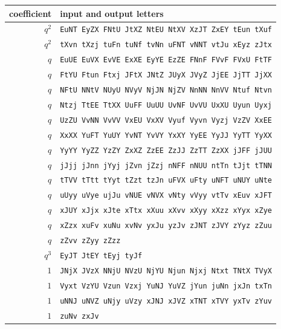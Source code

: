 \begin{tabular}{r@{\quad}l}
 coefficient & input and output letters \\ \hline
 $q^2$ & \texttt{EuNT EyZX FNtU JtXZ NtEU NtXV XzJT ZxEY tEun tXuf} \\
 $q^2$ & \texttt{tXvn tXzj tuFn tuNf tvNn uFNT vNNT vtJu xEyz zJtx} \\
 $q$ & \texttt{EuUE EuVX EvVE ExXE EyYE EzZE FNnF FVvF FVxU FtTF} \\
 $q$ & \texttt{FtYU Ftun Ftxj JFtX JNtZ JUyX JVyZ JjEE JjTT JjXX} \\
 $q$ & \texttt{NFtU NNtV NUyU NVyV NjJN NjZV NnNN NnVV Ntuf Ntvn} \\
 $q$ & \texttt{Ntzj TtEE TtXX UuFF UuUU UvNF UvVU UxXU Uyun Uyxj} \\
 $q$ & \texttt{UzZU VvNN VvVV VxEU VxXV Vyuf Vyvn Vyzj VzZV XxEE} \\
 $q$ & \texttt{XxXX YuFT YuUY YvNT YvVY YxXY YyEE YyJJ YyTT YyXX} \\
 $q$ & \texttt{YyYY YyZZ YzZY ZxXZ ZzEE ZzJJ ZzTT ZzXX jJFF jJUU} \\
 $q$ & \texttt{jJjj jJnn jYyj jZvn jZzj nNFF nNUU ntTn tJjt tTNN} \\
 $q$ & \texttt{tTVV tTtt tYyt tZzt tzJn uFVX uFty uNFT uNUY uNte} \\
 $q$ & \texttt{uUyy uVye ujJu vNUE vNVX vNty vVyy vtTv xEuv xJFT} \\
 $q$ & \texttt{xJUY xJjx xJte xTtx xXuu xXvv xXyy xXzz xYyx xZye} \\
 $q$ & \texttt{xZzx xuFv xuNu xvNv yxJu yzJv zJNT zJVY zYyz zZuu} \\
 $q$ & \texttt{zZvv zZyy zZzz} \\
 $q^3$ & \texttt{EyJT JtEY tEyj tyJf} \\
 $1$ & \texttt{JNjX JVzX NNjU NVzU NjYU Njun Njxj Ntxt TNtX TVyX} \\
 $1$ & \texttt{Vyxt VzYU Vzun Vzxj YuNJ YuVZ jYun juNn jxJn txTn} \\
 $1$ & \texttt{uNNJ uNVZ uNjy uVzy xJNJ xJVZ xTNT xTVY yxTv zYuv} \\
 $1$ & \texttt{zuNv zxJv} \\

\end{tabular}
